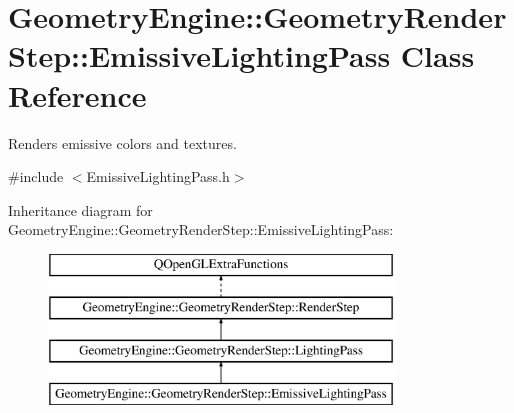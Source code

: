 \hypertarget{class_geometry_engine_1_1_geometry_render_step_1_1_emissive_lighting_pass}{}\section{Geometry\+Engine\+::Geometry\+Render\+Step\+::Emissive\+Lighting\+Pass Class Reference}
\label{class_geometry_engine_1_1_geometry_render_step_1_1_emissive_lighting_pass}


Renders emissive colors and textures.  




{\ttfamily \#include $<$Emissive\+Lighting\+Pass.\+h$>$}

Inheritance diagram for Geometry\+Engine\+::Geometry\+Render\+Step\+::Emissive\+Lighting\+Pass\+:\begin{figure}[H]
\begin{center}
\leavevmode
\includegraphics[height=4.000000cm]{class_geometry_engine_1_1_geometry_render_step_1_1_emissive_lighting_pass}
\end{center}
\end{figure}
